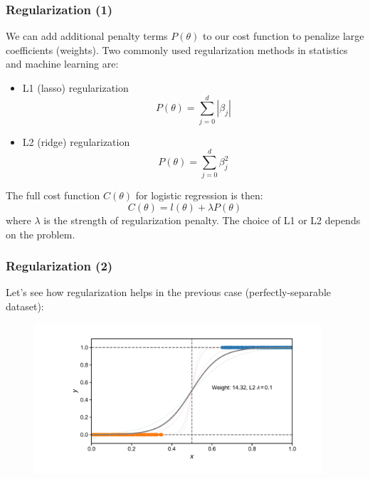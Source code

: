 \documentclass[10pt,aspectratio=169]{beamer}
\begin{document}
      \begin{frame}
        \frametitle{Regularization (1)}

        We can add additional penalty terms $P(\theta)$ to our cost
        function to penalize large coefficients (weights). Two
        commonly used regularization methods in statistics and machine
        learning are:

        \begin{itemize}
        \item L1 (lasso) regularization
          \begin{equation*}
            P(\theta) = \sum_{j=0}^{d} |\beta_{j}| 
          \end{equation*}

          
        \item L2 (ridge) regularization
          \begin{equation*}
            P(\theta) = \sum_{j=0}^{d} \beta_{j}^{2}
          \end{equation*}
        \end{itemize}

        The full cost function $C(\theta)$ for logistic regression is then:
        \begin{equation*}
          C(\theta) = l(\theta) + \lambda P(\theta)
        \end{equation*}
        where $\lambda$ is the strength of regularization penalty. The
        choice of L1 or L2 depends on the problem.
      \end{frame}

      \begin{frame}
        \frametitle{Regularization (2)}
        Let's see how regularization helps in the previous case
        (perfectly-separable dataset):

        \begin{figure}[t]
          \includegraphics[width=0.95\textwidth]{scripts/perfect_sep_reg.pdf}
        \end{figure}
      \end{frame}
\end{document}
